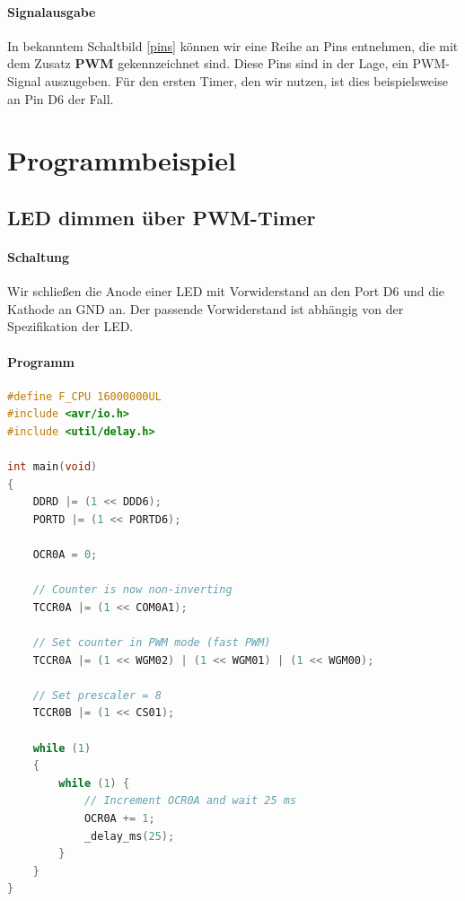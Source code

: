 \documentclass[11pt,a4paper]{scrartcl}
\begin{document}
\paragraph{Signalausgabe} In bekanntem Schaltbild \ref{pins} können wir eine Reihe an Pins entnehmen, die mit dem Zusatz \textbf{PWM} gekennzeichnet sind. Diese Pins sind in der Lage, ein PWM-Signal auszugeben. Für den ersten Timer, den wir nutzen, ist dies beispielsweise an Pin D6 der Fall.
\section{Programmbeispiel}
\subsection{LED dimmen über PWM-Timer}
\paragraph{Schaltung}
Wir schließen die Anode einer LED mit Vorwiderstand an den Port D6 und die Kathode an GND an. Der passende Vorwiderstand ist abhängig von der Spezifikation der LED.
\paragraph{Programm} \quad
\begin{lstlisting}[language=C]
#define F_CPU 16000000UL
#include <avr/io.h>
#include <util/delay.h>

int main(void)
{
	DDRD |= (1 << DDD6);
	PORTD |= (1 << PORTD6);
	
	OCR0A = 0;
	
	// Counter is now non-inverting
	TCCR0A |= (1 << COM0A1);
	
	// Set counter in PWM mode (fast PWM)
	TCCR0A |= (1 << WGM02) | (1 << WGM01) | (1 << WGM00);
	
	// Set prescaler = 8
	TCCR0B |= (1 << CS01);
    
    while (1) 
    {
		while (1) {
			// Increment OCR0A and wait 25 ms
			OCR0A += 1;
			_delay_ms(25);
		}
	}
}
\end{lstlisting}
\end{document}
